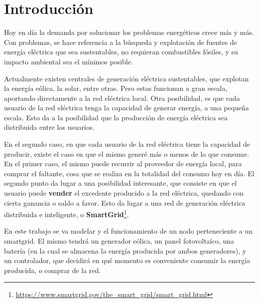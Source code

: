 \section{Introducción} Hoy en día la demanda por solucionar los problemas
energéticos crece más y más. Con problemas, se hace referencia a la búsqueda
y explotación de fuentes de energía eléctrica que sea sustentables, no
requieran combustibles fósiles, y su impacto ambiental sea el mínimos
posible.

Actualmente existen centrales de generación eléctrica sustentables, que
explotan la energía eólica, la solar, entre otras. Pero estas funcionan a
gran escala, aportando directamente a la red eléctrica local. Otra
posibilidad, es que cada usuario de la red eléctrica tenga la capacidad de
generar energía, a una pequeña escala. Esto da a la posibilidad que la
producción de energía eléctrica sea distribuida entre los usuarios.

En el segundo caso, en que cada usuario de la red eléctrica tiene la
capacidad de producir, existe el caso en que el mismo generé más o menos de
lo que consume. En el primer caso, el mismo puede recurrir al proveedor de
energía local, para comprar el faltante, cosa que se realiza en la totalidad
del consumo hoy en día. El segundo punto da lugar a una posibilidad
interesante, que consiste en que el usuario puede \textbf{vender} el
excedente producido a la red eléctrica, quedando con cierta ganancia o saldo
a favor. Esto da lugar a una red de generación eléctrica distribuida e
inteligente, o
\textbf{SmartGrid}\footnote{\url{https://www.smartgrid.gov/the_smart_grid/smart_grid.html}}.

En este trabajo se va modelar y el funcionamiento de un nodo perteneciente a
un smartgrid. El mismo tendrá un generador eólica, un panel fotovoltaíco, una
batería (en la cual se almacena la energía producida por ambos generadores),
y un controlador, que decidirá en qué momento es conveniente consumir la
energía producida, o comprar de la red.


